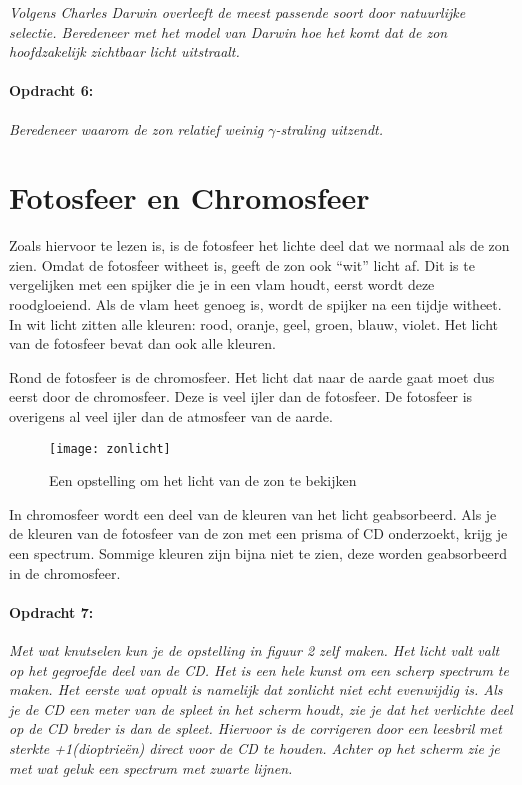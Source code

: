\emph{Volgens Charles Darwin overleeft de meest passende soort door
natuurlijke selectie. Beredeneer met het model van Darwin hoe het
komt dat de zon hoofdzakelijk zichtbaar licht uitstraalt.}


\paragraph*{Opdracht 6:}

\emph{Beredeneer waarom de zon relatief weinig $\gamma$-straling
uitzendt.}


\section{Fotosfeer en Chromosfeer}

Zoals hiervoor te lezen is, is de fotosfeer het lichte deel dat we
normaal als de zon zien. Omdat de fotosfeer witheet is, geeft de zon
ook ``wit'' licht af. Dit is te vergelijken met een spijker die
je in een vlam houdt, eerst wordt deze roodgloeiend. Als de vlam heet
genoeg is, wordt de spijker na een tijdje witheet. In wit licht zitten
alle kleuren: rood, oranje, geel, groen, blauw, violet. Het licht
van de fotosfeer bevat dan ook alle kleuren.

Rond de fotosfeer is de chromosfeer. Het licht dat naar de aarde gaat
moet dus eerst door de chromosfeer. Deze is veel ijler dan de fotosfeer.
De fotosfeer is overigens al veel ijler dan de atmosfeer van de aarde.

\begin{figure}[h]
\centering
\texttt{[image: zonlicht]}

\caption{Een opstelling om het licht van de zon te bekijken}
\end{figure}


In chromosfeer wordt een deel van de kleuren van het licht geabsorbeerd.
Als je de kleuren van de fotosfeer van de zon met een prisma of CD
onderzoekt, krijg je een spectrum. Sommige kleuren zijn bijna niet
te zien, deze worden geabsorbeerd in de chromosfeer.


\paragraph*{Opdracht 7:}

\emph{Met wat knutselen kun je de opstelling in figuur 2 zelf maken.
Het licht valt valt op het gegroefde deel van de CD. Het is een hele
kunst om een scherp spectrum te maken. Het eerste wat opvalt is namelijk
dat zonlicht niet echt evenwijdig is. Als je de CD een meter van de
spleet in het scherm houdt, zie je dat het verlichte deel op de CD
breder is dan de spleet. Hiervoor is de corrigeren door een leesbril
met sterkte +1(dioptrieën) direct voor de CD te houden. Achter op
het scherm zie je met wat geluk een spectrum met zwarte lijnen.}

